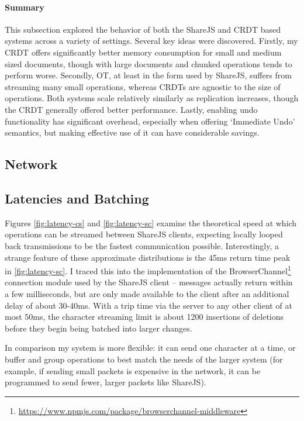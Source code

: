 \documentclass[12pt,a4paper,twoside,openright]{report}
\begin{document}
			\paragraph{Summary}
				This subsection explored the behavior of both the ShareJS and CRDT based systems across a variety of settings. Several key ideas were discovered. Firstly, my CRDT offers significantly better memory consumption for small and medium sized documents, though with large documents and chunked operations tends to perform worse. Secondly, OT, at least in the form used by ShareJS, suffers from streaming many small operations, whereas CRDTs are agnostic to the size of operations. Both systems scale relatively similarly as replication increases, though the CRDT generally offered better performance. Lastly, enabling undo functionality has significant overhead, especially when offering `Immediate Undo' semantics, but making effective use of it can have considerable savings.
					
		\subsection{Network}
			
		
			\subsection{Latencies and Batching}
			Figures \ref{fig:latency-cs} and \ref{fig:latency-sc} examine the theoretical speed at which operations can be streamed between ShareJS clients, expecting locally looped back transmissions to be the fastest communication possible. Interestingly, a strange feature of these approximate distributions is the 45ms return time peak in \ref{fig:latency-sc}. I traced this into the implementation of the BrowserChannel\footnote{\url{https://www.npmjs.com/package/browserchannel-middleware}} connection module used by the ShareJS client -- messages actually return within a few milliseconds, but are only made available to the client after an additional delay of about 30-40ms. With a trip time via the server to any other client of at most 50ms, the character streaming limit is about 1200 insertions of deletions before they begin being batched into larger changes.
			
			In comparison my system is more flexible: it can send one character at a time, or buffer and group operations to best match the needs of the larger system (for example, if sending small packets is expensive in the network, it can be programmed to send fewer, larger packets like ShareJS).			
			
\end{document}
